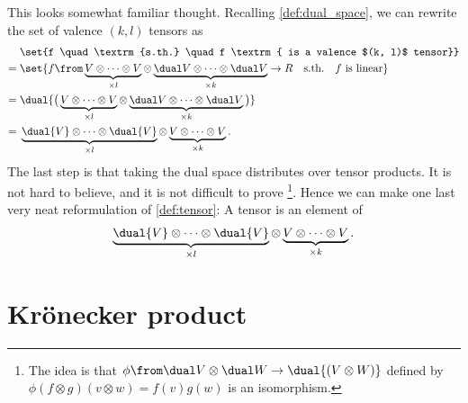 This looks somewhat familiar thought.
Recalling \cref{def:dual_space}, we can rewrite the set of valence $(k, l)$ tensors as
\begin{align*}
	&\set{f \quad \textrm{s.th.} \quad f \textrm{ is a valence $(k, l)$ tensor}}\\
	={}& \set{f \from \underbrace{V \otimes \dots \otimes V}_{\times l} \otimes \underbrace{\dual V \otimes \dots \otimes \dual V}_{\times k} \to R \quad \textrm{s.th.} \quad f \text{ is linear}}\\
	={}& \dual{\big( \underbrace{V \otimes \dots \otimes V}_{\times l} \otimes \underbrace{\dual V \otimes \dots \otimes \dual V}_{\times k} \big)}\\
	={}& \underbrace{\dual{V} \otimes \dots \otimes \dual{V}}_{\times l} \otimes \underbrace{V \otimes \dots \otimes V}_{\times k}.
\end{align*}
The last step is that taking the dual space distributes over tensor products.
It is not hard to believe, and it is not difficult to prove%
\footnote{%
	The idea is that $\phi \from \dual V \otimes \dual W \to \dual{(V \otimes W)}$ defined by $\phi(f \otimes g)(v \otimes w) = f(v) g(w)$ is an isomorphism.
}.
Hence we can make one last very neat reformulation of \cref{def:tensor}: A tensor is an element of
\begin{align*}
	\underbrace{\dual{V} \otimes \dots \otimes \dual{V}}_{\times l} \otimes \underbrace{V \otimes \dots \otimes V}_{\times k}.
\end{align*}


\section{Krönecker product}%
\label{sec:krönecker_product}

